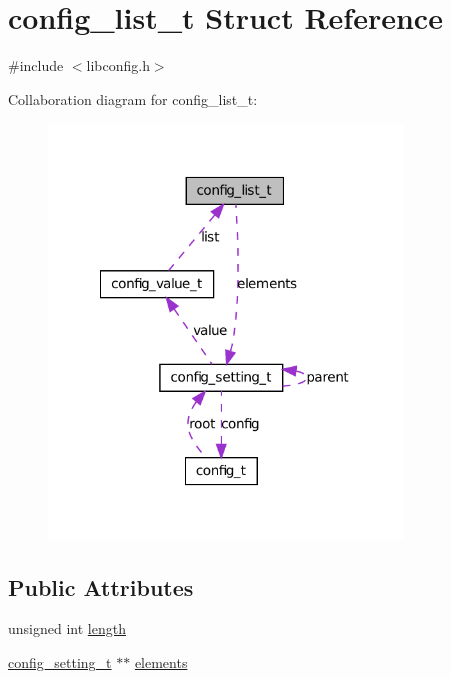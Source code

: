 \hypertarget{structconfig__list__t}{
\section{config\_\-list\_\-t Struct Reference}
\label{structconfig__list__t}
}


{\ttfamily \#include $<$libconfig.h$>$}



Collaboration diagram for config\_\-list\_\-t:
\nopagebreak
\begin{figure}[H]
\begin{center}
\leavevmode
\includegraphics[width=266pt]{structconfig__list__t__coll__graph}
\end{center}
\end{figure}
\subsection*{Public Attributes}
\begin{DoxyCompactItemize}
\item 
unsigned int \hyperlink{structconfig__list__t_a713729415280421d146ce4f590e33356}{length}
\item 
\hyperlink{structconfig__setting__t}{config\_\-setting\_\-t} $\ast$$\ast$ \hyperlink{structconfig__list__t_a8a0f0c428590f6630367748c0170c1ea}{elements}
\end{DoxyCompactItemize}


